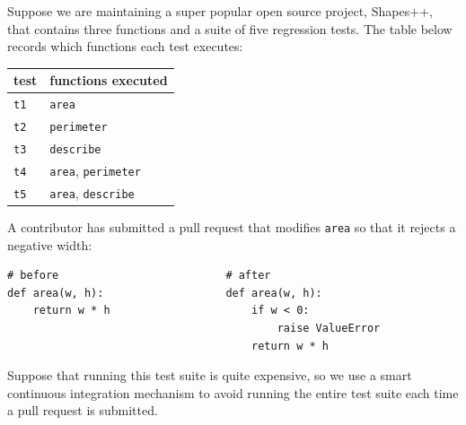 \documentclass[addpoints]{exam}
\newcommand{\Code}[1]{\texttt{#1}}
\begin{document}
\begin{questions}

\question Suppose we are maintaining a super popular open source
  project, \textsf{Shapes++}, that contains three functions and a
  suite of five regression tests. The table below records which
  functions each test executes:

  \begin{center}
    \begin{tabular}{ll}
      test & functions executed \\ \hline
      \Code{t1} & \Code{area} \\
      \Code{t2} & \Code{perimeter} \\
      \Code{t3} & \Code{describe} \\
      \Code{t4} & \Code{area}, \Code{perimeter} \\
      \Code{t5} & \Code{area}, \Code{describe} \\
    \end{tabular}
  \end{center}

  A contributor has submitted a pull request that modifies \Code{area}
  so that it rejects a negative width:
\begin{verbatim}
# before                          # after
def area(w, h):                   def area(w, h):
    return w * h                      if w < 0:
                                          raise ValueError
                                      return w * h
\end{verbatim}
  \noindent Suppose that running this test suite is quite expensive,
  so we use a smart continuous integration mechanism to avoid running
  the entire test suite each time a pull request is submitted.
\end{questions}
\end{document}
